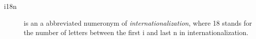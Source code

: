 \begin{description}







\item[i18n] is an a abbreviated numeronym of \emph{internationalization}, where 18 stands for the number of letters between the first i and last n in internationalization.
\end{description}